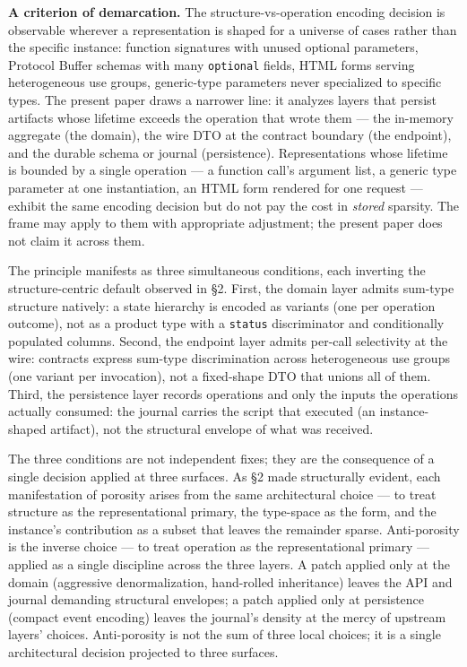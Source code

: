 \documentclass[
]{article}
\let\origtexttt\texttt%
\renewcommand{\texttt}[1]{\origtexttt{\seqsplit{#1}}}%
\let\texttt\origtexttt%
\begin{document}
\textbf{A criterion of demarcation.} The structure-vs-operation encoding
decision is observable wherever a representation is shaped for a
universe of cases rather than the specific instance: function signatures
with unused optional parameters, Protocol Buffer schemas with many
\texttt{optional} fields, HTML forms serving heterogeneous use groups,
generic-type parameters never specialized to specific types. The present
paper draws a narrower line: it analyzes layers that persist artifacts
whose lifetime exceeds the operation that wrote them --- the in-memory
aggregate (the domain), the wire DTO at the contract boundary (the
endpoint), and the durable schema or journal (persistence).
Representations whose lifetime is bounded by a single operation --- a
function call's argument list, a generic type parameter at one
instantiation, an HTML form rendered for one request --- exhibit the
same encoding decision but do not pay the cost in \emph{stored}
sparsity. The frame may apply to them with appropriate adjustment; the
present paper does not claim it across them.

The principle manifests as three simultaneous conditions, each inverting
the structure-centric default observed in §2. First, the domain layer
admits sum-type structure natively: a state hierarchy is encoded as
variants (one per operation outcome), not as a product type with a
\texttt{status} discriminator and conditionally populated columns.
Second, the endpoint layer admits per-call selectivity at the wire:
contracts express sum-type discrimination across heterogeneous use
groups (one variant per invocation), not a fixed-shape DTO that unions
all of them. Third, the persistence layer records operations and only
the inputs the operations actually consumed: the journal carries the
script that executed (an instance-shaped artifact), not the structural
envelope of what was received.

The three conditions are not independent fixes; they are the consequence
of a single decision applied at three surfaces. As §2 made structurally
evident, each manifestation of porosity arises from the same
architectural choice --- to treat structure as the representational
primary, the type-space as the form, and the instance's contribution as
a subset that leaves the remainder sparse. Anti-porosity is the inverse
choice --- to treat operation as the representational primary ---
applied as a single discipline across the three layers. A patch applied
only at the domain (aggressive denormalization, hand-rolled inheritance)
leaves the API and journal demanding structural envelopes; a patch
applied only at persistence (compact event encoding) leaves the
journal's density at the mercy of upstream layers' choices.
Anti-porosity is not the sum of three local choices; it is a single
architectural decision projected to three surfaces.
\end{document}
